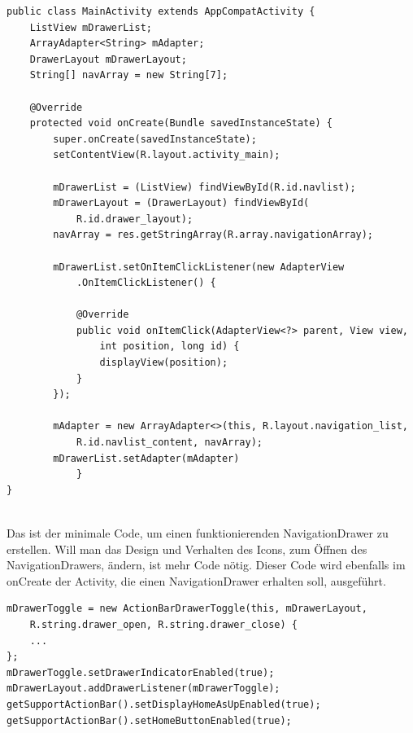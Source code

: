 \documentclass[FIPLY_base.tex]{subfiles}
\begin{document}
\newpage
\begin{lstlisting}
public class MainActivity extends AppCompatActivity {
	ListView mDrawerList;
	ArrayAdapter<String> mAdapter;
	DrawerLayout mDrawerLayout;
	String[] navArray = new String[7];
	
	@Override
	protected void onCreate(Bundle savedInstanceState) {
		super.onCreate(savedInstanceState);
		setContentView(R.layout.activity_main);
		
		mDrawerList = (ListView) findViewById(R.id.navlist);
		mDrawerLayout = (DrawerLayout) findViewById(
			R.id.drawer_layout);
		navArray = res.getStringArray(R.array.navigationArray);

		mDrawerList.setOnItemClickListener(new AdapterView
			.OnItemClickListener() {
			
			@Override
			public void onItemClick(AdapterView<?> parent, View view, 
				int position, long id) {		
				displayView(position);
			}
		});
	
		mAdapter = new ArrayAdapter<>(this, R.layout.navigation_list, 
			R.id.navlist_content, navArray);
		mDrawerList.setAdapter(mAdapter)
			}
}
\end{lstlisting}
\ \\
Das ist der minimale Code, um einen funktionierenden NavigationDrawer zu erstellen.
Will man das Design und Verhalten des Icons, zum Öffnen des NavigationDrawers, ändern, ist mehr Code nötig.
Dieser Code wird ebenfalls im onCreate der Activity, die einen NavigationDrawer erhalten soll, ausgeführt.
\ \\
\begin{lstlisting}
mDrawerToggle = new ActionBarDrawerToggle(this, mDrawerLayout,
	R.string.drawer_open, R.string.drawer_close) {
	...
};
mDrawerToggle.setDrawerIndicatorEnabled(true);
mDrawerLayout.addDrawerListener(mDrawerToggle);
getSupportActionBar().setDisplayHomeAsUpEnabled(true);
getSupportActionBar().setHomeButtonEnabled(true);
\end{lstlisting}
\end{document}
